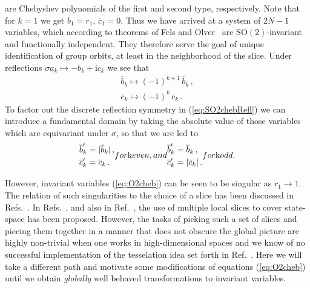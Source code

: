 \documentclass[aip,cha,showpacs,twocolumn,
 		  reprint]{revtex4-1} %
\newcommand{\bseq}{\begin{subequations}}
\newcommand{\eseq}{\end{subequations}}
\newcommand{\rf}     [1] {~\cite{#1}}
\newcommand{\refref} [1] {Ref.~\cite{#1}}
\newcommand{\refrefs}[1] {Refs.~\cite{#1}}
\newcommand{\refeq}  [1] {(\ref{#1})}
\newcommand{\SOn}[1]{\ensuremath{\textrm{SO}(#1)}}         %
\newcommand{\Refl}{\ensuremath{\sigma}}
\newcommand{\ii}{\ensuremath{\mathrm{i}}} %
\begin{document}
are Chebyshev polynomials of the first and second type, respectively.
Note that for $k=1$ we get $\overline{b}_1=r_1,\, \overline{c}_1=0$.
Thus we have arrived at a system of $2N-1$ variables, which according to
theorems of Fels and Olver\rf{FelsOlver98,FelsOlver99} are
$\SOn{2}$-invariant and functionally independent. They therefore serve the goal
of unique identification of group orbits, at least in the neighborhood of the
slice. Under reflections $\Refl a_k \mapsto-b_k+\ii c_k$ we see that
\bseq\label{eq:SO2chebRefl}
 \begin{align}
  \overline{b}_k \mapsto (-1)^{k+1}\, \overline{b}_k\,,\\
  \overline{c}_k \mapsto (-1)^{k}\, \overline{c}_k\,.
 \end{align}
\eseq
 To factor out the discrete reflection symmetry in \refeq{eq:SO2chebRefl} we can
introduce a fundamental domain by taking the absolute value of those variables
which are equivariant under $\Refl$, so that we are led to
\bseq\label{eq:O2cheb}
  \begin{align}
    \overline{b}'_k &=
		    |\overline{b}_k|\,, \\
    \overline{c}'_k &=
		    \overline{c}_k\,.
  \end{align}
for $k$ even, and
  \begin{align}
    \overline{b}'_k &=
		    \overline{b}_k\,, \\
    \overline{c}'_k &=
		    |\overline{c}_k|\,.
  \end{align}
for $k$ odd.
\eseq

However, invariant variables \refeq{eq:O2cheb} can be seen to be singular as
$r_1\rightarrow1$. The relation of such singularities to the choice of a slice
has been discussed in \refrefs{SiminosThesis, SiCvi10, FrCv11}. In
\refrefs{SiCvi10, FrCv11}, and also in \refref{rowley_reconstruction_2000},
the use of multiple local slices to cover state-space has been proposed.
However, the tasks of picking such a set of slices
and piecing them together in a manner that does not obscure the global picture
are highly non-trivial when one works in high-dimensional spaces and we know
of no successful implementation of the tesselation idea set forth in
\refref{FrCv11}. Here we will take a different path and motivate some
modifications of equations \refeq{eq:O2cheb} until we obtain
\emph{globally} well behaved transformations to invariant variables.
\end{document}
